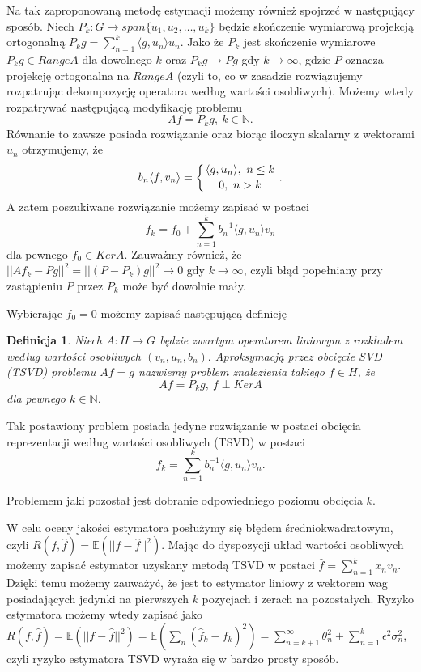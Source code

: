 \documentclass[12pt]{article}
\newtheorem{df}{Definicja}
\begin{document}
Na tak zaproponowaną metodę estymacji możemy również spojrzeć w następujący sposób. Niech $P_k\colon G\to span\{u_1,u_2,\dots,u_k\}$ będzie skończenie wymiarową projekcją ortogonalną $P_kg=\sum_{n=1}^k\langle g,u_n\rangle u_n.$ Jako że $P_k$ jest skończenie wymiarowe $P_kg\in RangeA$ dla dowolnego $k$ oraz $P_kg\to Pg$ gdy $k\to \infty$, gdzie $P$ oznacza projekcję ortogonalna na $\overline{RangeA}$ (czyli to, co w zasadzie rozwiązujemy rozpatrując dekompozycję operatora według wartości osobliwych). Możemy wtedy rozpatrywać następującą modyfikację problemu
\begin{displaymath}
Af=P_kg,\ k\in\mathbb{N}.
\end{displaymath}
Równanie to zawsze posiada rozwiązanie oraz biorąc iloczyn skalarny z wektorami $u_n$ otrzymujemy, że 
\begin{displaymath}
b_n\langle f,v_n\rangle=\left\{{\langle g,u_n\rangle,\ n\leq k}\atop {0,\ n>k}\right. .
\end{displaymath}
A zatem poszukiwane rozwiązanie możemy zapisać w postaci
\begin{displaymath}
f_k=f_0+\sum_{n=1}^kb_n^{-1}\langle g, u_n\rangle v_n
\end{displaymath}
dla pewnego $f_0\in KerA$.
Zauważmy również, że $||Af_k-Pg||^2=||(P-P_k)g||^2\to 0$ gdy $k\to \infty$, czyli błąd popełniany przy zastąpieniu $P$ przez $P_k$ może być dowolnie mały.

Wybierając $f_0=0$ możemy zapisać następującą definicję
\begin{df}
Niech $A\colon H\to G$ będzie zwartym operatorem liniowym z rozkładem według wartości osobliwych $(v_n,u_n,b_n).$ Aproksymacją przez obcięcie SVD (TSVD) problemu $Af=g$ nazwiemy problem znalezienia takiego $f\in H$, że 
\begin{displaymath}
Af=P_kg,\ f\perp KerA
\end{displaymath}
dla pewnego $k\in \mathbb{N}$.
\end{df}
Tak postawiony problem posiada jedyne rozwiązanie w postaci obcięcia reprezentacji według wartości osobliwych (TSVD) w postaci
\begin{displaymath}
f_k=\sum_{n=1}^kb_n^{-1}\langle g,u_n\rangle v_n.
\end{displaymath}

Problemem jaki pozostał jest dobranie odpowiedniego poziomu obcięcia $k$.

W celu oceny jakości estymatora posłużymy się błędem średniokwadratowym, czyli $R(f,\hat{f})=\mathbb{E}(||f-\hat{f}||^2)$. Mając do dyspozycji układ wartości osobliwych możemy zapisać estymator uzyskany metodą TSVD w postaci $\hat{f}=\sum_{n=1}^kx_nv_n$. Dzięki temu możemy zauważyć, że jest to estymator liniowy z wektorem wag posiadających jedynki na pierwszych $k$ pozycjach i zerach na pozostałych. Ryzyko estymatora możemy wtedy zapisać jako $R(f,\hat{f})=\mathbb{E}(||f-\hat{f}||^2)=\mathbb{E}(\sum_n(\hat{f}_k-f_k)^2)=\sum_{n=k+1}^{\infty}\theta_n^2+\sum_{n=1}^k\epsilon^2\sigma_n^2$, czyli ryzyko estymatora TSVD wyraża się w bardzo prosty sposób.
\end{document}
